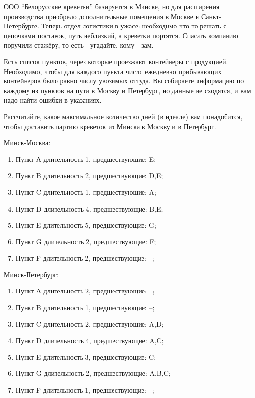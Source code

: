 \question
ООО “Белорусские креветки” базируется в Минске, но для расширения производства приобрело дополнительные помещения в Москве и Санкт-Петербурге. Теперь отдел логистики в ужасе: необходимо что-то решать с цепочками поставок, путь неблизкий, а креветки портятся. Спасать компанию поручили стажёру, то есть - угадайте, кому - вам.

Есть список пунктов, через которые проезжают контейнеры с продукцией. Необходимо, чтобы для каждого пункта число ежедневно прибывающих контейнеров было равно числу увозимых оттуда. Вы собираете информацию по каждому из пунктов на пути в Москву и Петербург, но данные не сходятся, и вам надо найти ошибки в указаниях.

Рассчитайте, какое максимальное количество дней (в идеале) вам понадобится, чтобы доставить партию креветок из Минска в Москву и в Петербург.


Минск-Москва:
\begin{enumerate}
\item Пункт А длительность 1, предшествующие: E;
\item Пункт B длительность 2, предшествующие: D,E;
\item Пункт C длительность 1, предшествующие: A;
\item Пункт D длительность 4, предшествующие: B,E;
\item Пункт E длительность 5, предшествующие: G;
\item Пункт G длительность 2, предшествующие: F;
\item Пункт F длительность 2, предшествующие: –;
\end{enumerate}
Минск-Петербург:
\begin{enumerate}
\item Пункт А длительность 2, предшествующие: –;
\item Пункт B длительность 1, предшествующие: –;
\item Пункт C длительность 2, предшествующие: A,D;
\item Пункт D длительность 4, предшествующие: A,C;
\item Пункт E длительность 3, предшествующие: C;
\item Пункт G длительность 2, предшествующие: A,B,C;
\item Пункт F длительность 1, предшествующие: –;
\end{enumerate}
